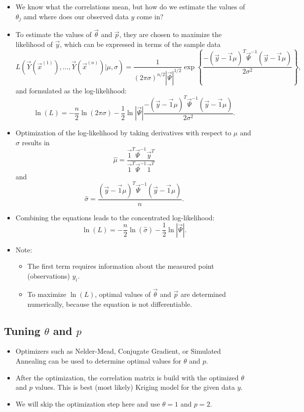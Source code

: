 \documentclass[
  letterpaper,
  DIV=11,
  numbers=noendperiod]{scrreprt}
\providecommand{\tightlist}{%
  \setlength{\itemsep}{0pt}\setlength{\parskip}{0pt}}\usepackage{longtable,booktabs,array}
\begin{document}
\begin{itemize}
\tightlist
\item
  We know what the correlations mean, but how do we estimate the values
  of \(\theta_j\) amd where does our observed data \(y\) come in?
\item
  To estimate the values of \(\vec{\theta}\) and \(\vec{p}\), they are
  chosen to maximize the likelihood of \(\vec{y}\), which can be
  expressed in terms of the sample data
  \[L\left(\vec{Y}(\vec{x}^{(1)}), \ldots, \vec{Y}(\vec{x}^{(n)}) | \mu, \sigma \right) = \frac{1}{(2\pi \sigma)^{n/2} |\vec{\Psi}|^{1/2}} \exp\left\{ \frac{-(\vec{y} - \vec{1}\mu)^T \vec{\Psi}^{-1}(\vec{y} - \vec{1}\mu) }{2 \sigma^2}\right\},\]
  and formulated as the log-likelihood:
  \[\ln(L) = - \frac{n}{2} \ln(2\pi \sigma) - \frac{1}{2} \ln |\vec{\Psi}| \frac{-(\vec{y} - \vec{1}\mu)^T \vec{\Psi}^{-1}(\vec{y} - \vec{1}\mu) }{2 \sigma^2}.\]
\item
  Optimization of the log-likelihood by taking derivatives with respect
  to \(\mu\) and \(\sigma\) results in
  \[\hat{\mu} = \frac{\vec{1}^T \vec{\Psi}^{-1} \vec{y}^T}{\vec{1}^T \vec{\Psi}^{-1} \vec{1}^T}\]
  and
  \[\hat{\sigma} = \frac{(\vec{y} - \vec{1}\mu)^T \vec{\Psi}^{-1}(\vec{y} - \vec{1}\mu)}{n}.\]
\item
  Combining the equations leads to the concentrated log-likelihood:
  \[\ln(L) = - \frac{n}{2} \ln(\hat{\sigma}) - \frac{1}{2} \ln |\vec{\Psi}|.\]
\item
  Note:

  \begin{itemize}
  \tightlist
  \item
    The first term requires information about the measured point
    (observations) \(y_i\).
  \item
    To maximize \(\ln(L)\), optimal values of \(\vec{\theta}\) and
    \(\vec{p}\) are determined numerically, because the equation is not
    differentiable.
  \end{itemize}
\end{itemize}

\hypertarget{tuning-theta-and-p}{%
\subsection{\texorpdfstring{Tuning \(\theta\) and
\(p\)}{Tuning \textbackslash theta and p}}\label{tuning-theta-and-p}}

\begin{itemize}
\tightlist
\item
  Optimizers such as Nelder-Mead, Conjugate Gradient, or Simulated
  Annealing can be used to determine optimal values for \(\theta\) and
  \(p\).
\item
  After the optimization, the correlation matrix is build with the
  optimized \(\theta\) and \(p\) values. This is best (most likely)
  Kriging model for the given data \(y\).
\item
  We will skip the optimization step here and use \(\theta = 1\) and
  \(p=2\).
\end{itemize}
\end{document}
